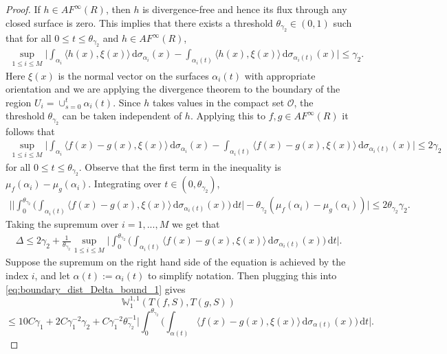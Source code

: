 \documentclass[11pt]{article}
\theoremstyle{remark}
\theoremstyle{definition}
\newcommand{\mc}[1]{\mathcal{#1}}
\newcommand{\m}[1]{\mathbb{#1}}
\newcommand{\dd}{\mathrm{d}}
\begin{document}
\begin{proof}
If $h\in AF^\infty(R)$, then $h$ is divergence-free and hence its flux through any closed surface is zero. This implies that there exists a threshold $\theta_{\gamma_2}\in (0,1)$ such that for all $0\leq t\leq \theta_{\gamma_2}$ and $h\in AF^\infty(R)$,
\begin{align}
	\sup_{1\leq i\leq M}\bigg|\int_{\alpha_i} \langle h(x), \xi(x)\rangle\, \dd \sigma_{\alpha_i}(x) - \int_{\alpha_i(t)} \langle h (x), \xi(x) \rangle\, \dd \sigma_{\alpha_i(t)}(x)\bigg| \leq \gamma_2.\label{equation: surface measures close_1}
\end{align}
Here $\xi(x)$ is the normal vector on the surfaces $\alpha_i(t)$ with appropriate orientation and we are applying the divergence theorem to the boundary of the region $U_i=\cup_{s=0}^t\alpha_i(t)$. Since $h$ takes values in the compact set $\mc O$, the threshold $\theta_{\gamma_2}$ can be taken independent of $h$. Applying this to $f,g\in AF^\infty(R)$ it follows that
\begin{align*}
	\sup_{1\leq i\leq M}\bigg|\int_{\alpha_i} \langle f(x)-g(x), \xi(x)\rangle\, \dd \sigma_{\alpha_i}(x) - \int_{\alpha_i(t)} \langle f (x)- g(x), \xi(x) \rangle\, \dd \sigma_{\alpha_i(t)}(x)\bigg| \leq 2\gamma_2
\end{align*}
for all $0\leq t\leq \theta_{\gamma_2}$. Observe that the first term in the inequality is $\mu_{ f}(\alpha_i)- \mu_{ g}(\alpha_i)$. Integrating over $t\in (0,\theta_{\gamma_2})$, 
\begin{align*}
	\bigg| \bigg| \int_{0}^{\theta_{\gamma_2}}\bigg(\int_{\alpha_i(t)} \langle f (x)-g(x), \xi(x)\rangle\, \dd \sigma_{\alpha_i(t)} (x)\bigg)\, \dd t\bigg| - \theta_{\gamma_2} (\mu_f(\alpha_i)-\mu_g(\alpha_i))\bigg| \leq 2\theta_{\gamma_2} \gamma_2. 
\end{align*}
Taking the supremum over $i=1,...,M$ we get that
\begin{align*}
	\Delta\leq 2\gamma_2 + \frac{1}{\theta_{\gamma_2}}\sup_{1\leq i \leq M} \bigg| \int_{0}^{\theta_{\gamma_2}}\bigg(\int_{\alpha_i(t)} \langle f (x)-g(x), \xi(x)\rangle\, \dd \sigma_{\alpha_i(t)} (x)\bigg)\, \dd t\bigg|.
\end{align*}
Suppose the supremum on the right hand side of the equation is achieved by the index $i$, and let $\alpha(t):=\alpha_i(t)$ to simplify notation. Then plugging this into \eqref{eq:boundary_dist_Delta_bound_1} gives
\begin{equation}\label{eq:trace_distance_bound_1}
	\m W^{1,1}_1(T(f, S), T(g, S)) 
 \end{equation}
$$\leq 10 C \gamma_1 + 2C\gamma_1^{-2} \gamma_2+ C \gamma_1^{-2} \theta_{\gamma_2}^{-1} \bigg| \int_{0}^{\theta_{\gamma_2}}\bigg(\int_{\alpha(t)} \langle f (x)-g(x), \xi(x) \rangle\, \dd \sigma_{\alpha(t)} (x)\bigg)\, \dd t\bigg|.$$

\end{proof}
\end{document}
